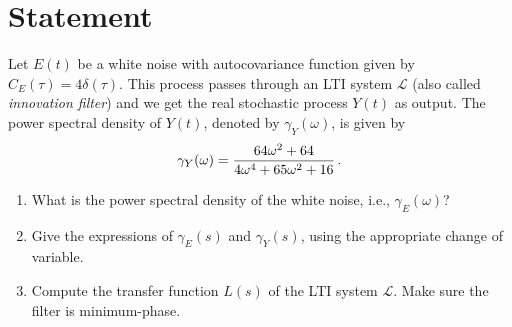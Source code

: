 \documentclass[11pt]{article}
\newcommand{\cov}{C}
\begin{document}
\section{Statement}
Let \(E(t)\) be a white noise with autocovariance function given by \(\cov_E(\tau) = 4 \delta(\tau)\).
This process passes through an LTI system \(\mathcal{L}\) (also called \emph{innovation filter}) and we get the real stochastic process \(Y(t)\) as output.
The power spectral density of \(Y(t)\), denoted by \(\gamma_Y(\omega)\), is given by
\begin{equation}
\gamma_Y(\omega) = \frac{64 \omega^2 + 64}{4 \omega^4 + 65 \omega^2 + 16}\,.\notag
\end{equation}

\begin{enumerate}
	\item What is the power spectral density of the white noise, i.e., \(\gamma_E(\omega)\)?
	\item Give the expressions of \(\gamma_E(s)\) and \(\gamma_Y(s)\), using the appropriate change of variable.
	\item Compute the transfer function \(L(s)\) of the LTI system \(\mathcal{L}\).
	Make sure the filter is minimum-phase.
\end{enumerate}
\end{document}
